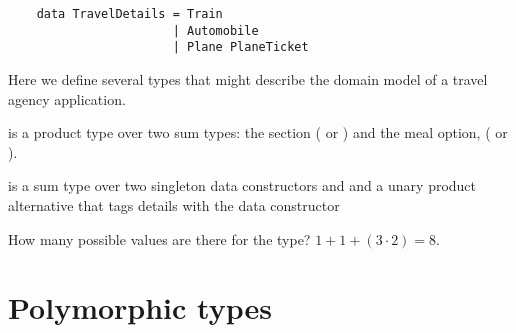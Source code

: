 \begin{notelist}
\begin{notelist}
\begin{lstlisting}
    data TravelDetails = Train
                       | Automobile
                       | Plane PlaneTicket
    \end{lstlisting}
    \begin{notelist}
        \item Here we define several types that might describe the domain model of a travel agency application.
        \item {} is a product type over two sum types: the section ( or ) and the meal option,
              ( or ).
        \item {} is a sum type over two singleton data constructors  and  and a unary
              product alternative that tags  details with the data constructor 
        \item How many possible values are there for the  type? $1 + 1 + (3 \cdot 2) = 8$.
    \end{notelist}
\end{notelist}
\end{notelist}

\section{Polymorphic types}

